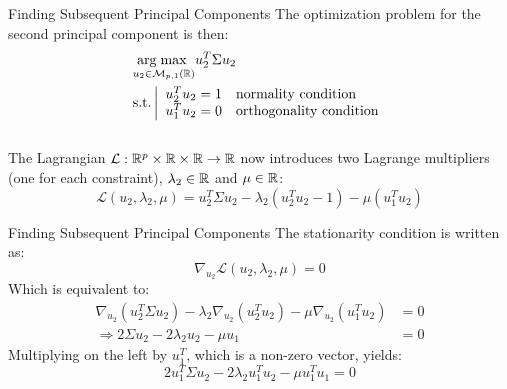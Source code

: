 \begin{frame}{Finding Subsequent Principal Components}
	The optimization problem for the second principal component is then:
	\begin{equation}
		\begin{aligned}
			&\underset{u_2 \in \mathcal{M}_{p,1}(\mathbb{R})}{\operatorname{arg\;max}\;} u_2^T \Sigma u_2 \\
			&\text{s.t.} 
			\left|
			\begin{array}{ll}
				u_2^T u_2 = 1 & \text{normality condition} \\
				u_1^T u_2 = 0 & \text{orthogonality condition}
			\end{array}
			\right.
		\end{aligned}
		\nonumber
	\end{equation}\\
	\vspace{0.5cm}
	\pause
	The Lagrangian $\mathcal{L}: \mathbb{R}^p \times \mathbb{R} \times \mathbb{R} \to \mathbb{R}$ now introduces two Lagrange multipliers (one for each constraint), $\lambda_2 \in \mathbb{R}$ and $\mu \in \mathbb{R}$:
	\begin{equation}
		\mathcal{L}(u_2, \lambda_2, \mu) = u_2^T \Sigma u_2 - \lambda_2 \left(u_2^T u_2 - 1\right) - \mu \left(u_1^T u_2\right)
		\nonumber
	\end{equation}
\end{frame}

\begin{frame}{Finding Subsequent Principal Components}
	The stationarity condition is written as:
	\begin{equation}
		\nabla_{u_2} \mathcal{L}(u_2, \lambda_2, \mu) = 0 
		\nonumber
	\end{equation}
	\pause
	Which is equivalent to:
	\begin{equation}
		\begin{aligned}
			\nabla_{u_2}\left(u_2^T \Sigma u_2\right) - \lambda_2 \nabla_{u_2}\left(u_2^T u_2\right) - \mu \nabla_{u_2}\left(u_1^T u_2\right) &= 0 \\
			\Rightarrow 2 \Sigma u_2 - 2 \lambda_2 u_2 - \mu u_1 &= 0
		\end{aligned}
		\nonumber
	\end{equation}
	\pause
	Multiplying on the left by $u_1^T$, which is a non-zero vector, yields:
	\begin{equation}
		2 u_1^T \Sigma u_2 - 2 \lambda_2 u_1^T u_2 - \mu u_1^T u_1 = 0
		\nonumber
	\end{equation}
\end{frame}

